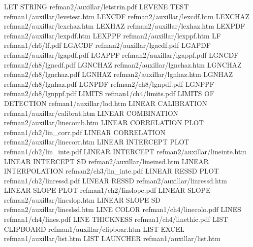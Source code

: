 LET STRING                              refman2/auxillar/letstrin.pdf
LEVENE TEST                             refman1/auxillar/levetest.htm
LEXCDF                                  refman2/auxillar/lexcdf.htm
LEXCHAZ                                 refman2/auxillar/lexchaz.htm
LEXHAZ                                  refman2/auxillar/lexhaz.htm
LEXPDF                                  refman2/auxillar/lexpdf.htm
LEXPPF                                  refman2/auxillar/lexppf.htm
LF                                      refman1/ch6/lf.pdf
LGACDF                                  refman2/auxillar/lgacdf.pdf
LGAPDF                                  refman2/auxillar/lgapdf.pdf
LGAPPF                                  refman2/auxillar/lgappf.pdf
LGNCDF                                  refman2/ch8/lgncdf.pdf
LGNCHAZ                                 refman2/auxillar/lgnchaz.htm
LGNCHAZ                                 refman2/ch8/lgnchaz.pdf
LGNHAZ                                  refman2/auxillar/lgnhaz.htm
LGNHAZ                                  refman2/ch8/lgnhaz.pdf
LGNPDF                                  refman2/ch8/lgnpdf.pdf
LGNPPF                                  refman2/ch8/lgnppf.pdf
LIMITS                                  refman1/ch4/limits.pdf
LIMITS OF DETECTION                     refman1/auxillar/lod.htm
LINEAR CALIBRATION                      refman1/auxillar/calibrat.htm
LINEAR COMBINATION                      refman2/auxillar/linecomb.htm
LINEAR CORRELATION PLOT                 refman1/ch2/lin_corr.pdf
LINEAR CORRELATION                      refman2/auxillar/linecorr.htm
LINEAR INTERCEPT PLOT                   refman1/ch2/lin_inte.pdf
LINEAR INTERCEPT                        refman2/auxillar/lineinte.htm
LINEAR INTERCEPT SD                     refman2/auxillar/lineinsd.htm
LINEAR INTERPOLATION                    refman2/ch3/lin_inte.pdf
LINEAR RESSD PLOT                       refman1/ch2/linressd.pdf
LINEAR RESSD                            refman2/auxillar/linressd.htm
LINEAR SLOPE PLOT                       refman1/ch2/linslope.pdf
LINEAR SLOPE                            refman2/auxillar/lineslop.htm
LINEAR SLOPE SD                         refman2/auxillar/lineslsd.htm
LINE COLOR                              refman1/ch4/linecolo.pdf
LINES                                   refman1/ch4/lines.pdf
LINE THICKNESS                          refman1/ch4/linethic.pdf
LIST CLIPBOARD                          refman1/auxillar/clipboar.htm
LIST EXCEL                              refman1/auxillar/list.htm
LIST LAUNCHER                           refman1/auxillar/list.htm
